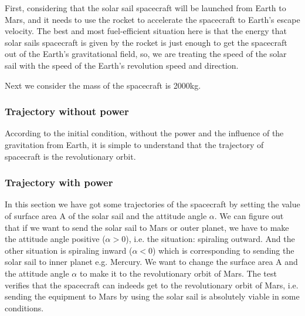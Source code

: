 \documentclass[../Paper.tex]{subfiles}
\begin{document}
First, considering that the solar sail spacecraft will be launched from Earth to Mars, and it needs to use the rocket to accelerate the spacecraft to Earth's escape velocity. The best and most fuel-efficient situation here is that the energy that solar sails spacecraft is given by the rocket is just enough to get the spacecraft out of the Earth's gravitational field, so, we are treating the speed of the solar sail with the speed of the Earth's revolution speed  and direction.

Next we consider the mass of the spacecraft is 2000kg.

\subsubsection{Trajectory without power}

According to the initial condition, without the power and the influence of the gravitation from Earth, it is simple to understand that the trajectory of spacecraft is the revolutionary orbit.

\subsubsection{Trajectory with power}

In this section we have got some trajectories of the spacecraft by setting the value of surface area A of the solar sail and the attitude angle $\alpha$. We can figure out that if we want to send the solar sail to Mars or outer planet, we have to make the attitude angle positive ($\alpha > 0$),  i.e. the situation: spiraling outward. And the other situation is spiraling inward ($\alpha < 0$) which is corresponding to sending the solar sail to inner planet e.g. Mercury. We want to change the surface area A and the attitude angle $\alpha$ to make it to the revolutionary orbit of Mars. The test verifies that the spacecraft can indeeds get to the revolutionary orbit of Mars, i.e. sending the equipment to Mars by using the solar sail is absolutely viable in some conditions.


\end{document}
